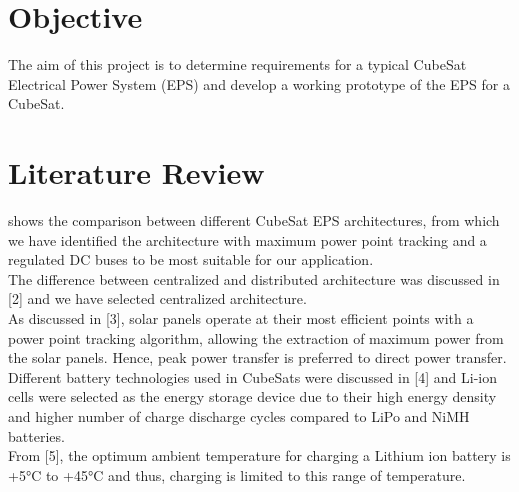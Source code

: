 \section{Objective}

The aim of this project is to determine requirements for a typical CubeSat Electrical Power System (EPS) and develop a working prototype of the EPS for a CubeSat.

\section{Literature Review}
\justifying
[1] shows the comparison between different CubeSat EPS architectures, from which we have identified the architecture with maximum power point tracking and a regulated DC buses to be most suitable for our application.
\\

The difference between centralized and distributed architecture was discussed in [2] and we have selected centralized architecture.
\\

As discussed in [3], solar panels operate at their most efficient points with a power point tracking algorithm, allowing the extraction of maximum power from the solar panels. Hence, peak power transfer is preferred to direct power transfer.
\\

Different battery technologies used in CubeSats were discussed in [4] and Li-ion cells were selected as the energy storage device due to their high energy density and higher number of charge discharge cycles compared to LiPo and NiMH batteries.
\\

From [5], the optimum ambient temperature for charging a Lithium ion battery is +5°C to +45°C and thus, charging is limited to this range of temperature.